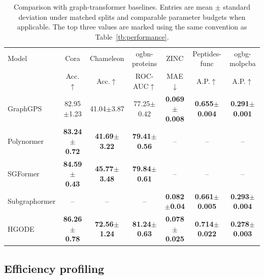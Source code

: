 \documentclass{article}
\newcommand{\best}[1]{\cellcolor{Best}\textbf{#1}}
\newcommand{\second}[1]{\cellcolor{Second}\textbf{#1}}
\newcommand{\third}[1]{\cellcolor{Third}\textbf{#1}}
\theoremstyle{plain}
\theoremstyle{definition}
\theoremstyle{remark}
\begin{document}
\begin{table}[H]
    \caption{Comparison with graph-transformer baselines. Entries are mean $\pm$ standard deviation under matched splits and comparable parameter budgets when applicable. The top three values are marked using the same convention as Table~\ref{tb:performance}.}
    \label{tab:transformer_baselines}
    \centering
    {\footnotesize
        \setlength{\tabcolsep}{5pt}
        \renewcommand{\arraystretch}{1.05}
        \begin{tabular}{lcccccc}
            \toprule
            Model         & Cora                    & Chameleon               & ogbn-proteins           & ZINC                    & Peptides-func            & ogbg-molpcba            \\
                          & Acc.$\uparrow$          & Acc.$\uparrow$          & ROC-AUC$\uparrow$       & MAE$\downarrow$         & A.P.$\uparrow$           & A.P.$\uparrow$          \\
            \midrule
            GraphGPS      & 82.95$\pm$1.23          & 41.04$\pm$3.87          & 77.25$\pm$0.42          & \best{0.069$\pm$0.008}  & \third{0.655$\pm$0.004}  & \second{0.291$\pm$0.001} \\
            Polynormer    & \third{83.24$\pm$0.72}  & \third{41.69$\pm$3.22}  & \third{79.41$\pm$0.56}  & --                      & --                       & --                      \\
            SGFormer      & \second{84.59$\pm$0.43} & \second{45.77$\pm$3.48} & \second{79.84$\pm$0.61} & --                      & --                       & --                      \\
            Subgraphormer & --                      & --                      & --                      & \third{0.082$\pm$0.04}  & \second{0.661$\pm$0.005} & \best{0.293$\pm$0.004}  \\
            HGODE         & \best{86.26$\pm$0.78}   & \best{72.56$\pm$1.24}   & \best{81.24$\pm$0.63}   & \second{0.078$\pm$0.025} & \best{0.714$\pm$0.022}   & \third{0.278$\pm$0.003} \\
            \bottomrule
        \end{tabular}}
\end{table}

\subsection{Efficiency profiling}
\label{app:efficiency}
\end{document}
